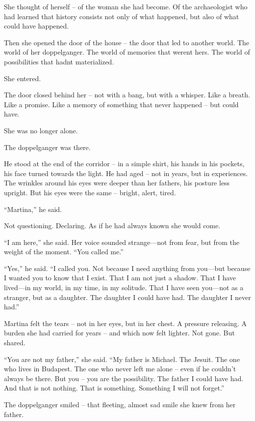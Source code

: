 \documentclass[
]{article}
\begin{document}
She thought of herself -- of the woman she had become. Of the archaeologist who had learned that history consists not only of what happened, but also of what could have happened.

Then she opened the door of the house -- the door that led to another world. The world of her doppelganger. The world of memories that weren\textquotesingle t hers. The world of possibilities that hadn\textquotesingle t materialized.

She entered.

The door closed behind her -- not with a bang, but with a whisper. Like a breath. Like a promise. Like a memory of something that never happened -- but could have.

She was no longer alone.

The doppelganger was there.

He stood at the end of the corridor -- in a simple shirt, his hands in his pockets, his face turned towards the light. He had aged -- not in years, but in experiences. The wrinkles around his eyes were deeper than her father\textquotesingle s, his posture less upright. But his eyes were the same -- bright, alert, tired.

``Martina,'' he said.

Not questioning. Declaring. As if he had always known she would come.

``I am here,'' she said. Her voice sounded strange---not from fear, but from the weight of the moment. ``You called me.''

``Yes,'' he said. ``I called you. Not because I need anything from you---but because I wanted you to know that I exist. That I am not just a shadow. That I have lived---in my world, in my time, in my solitude. That I have seen you---not as a stranger, but as a daughter. The daughter I could have had. The daughter I never had.''

Martina felt the tears -- not in her eyes, but in her chest. A pressure releasing. A burden she had carried for years -- and which now felt lighter. Not gone. But shared.

``You are not my father,'' she said. ``My father is Michael. The Jesuit. The one who lives in Budapest. The one who never left me alone -- even if he couldn't always be there. But you -- you are the possibility. The father I could have had. And that is not nothing. That is something. Something I will not forget.''

The doppelganger smiled -- that fleeting, almost sad smile she knew from her father.
\end{document}
